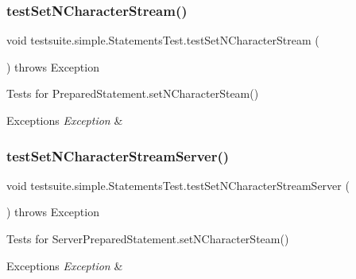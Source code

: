 \subsubsection{\texorpdfstring{test\+Set\+N\+Character\+Stream()}{testSetNCharacterStream()}}
{\footnotesize\ttfamily void testsuite.\+simple.\+Statements\+Test.\+test\+Set\+N\+Character\+Stream (\begin{DoxyParamCaption}{ }\end{DoxyParamCaption}) throws Exception}

Tests for Prepared\+Statement.\+set\+N\+Character\+Steam()


\begin{DoxyExceptions}{Exceptions}
{\em Exception} & \\
\hline
\end{DoxyExceptions}
\mbox{\label{classtestsuite_1_1simple_1_1_statements_test_ad1250f33b64cf0554fc2a5e779878e01}} 
\subsubsection{\texorpdfstring{test\+Set\+N\+Character\+Stream\+Server()}{testSetNCharacterStreamServer()}}
{\footnotesize\ttfamily void testsuite.\+simple.\+Statements\+Test.\+test\+Set\+N\+Character\+Stream\+Server (\begin{DoxyParamCaption}{ }\end{DoxyParamCaption}) throws Exception}

Tests for Server\+Prepared\+Statement.\+set\+N\+Character\+Steam()


\begin{DoxyExceptions}{Exceptions}
{\em Exception} & \\
\hline
\end{DoxyExceptions}
\mbox{\label{classtestsuite_1_1simple_1_1_statements_test_a31aad5a1989e2b9189e57c75eea14e52}} 
